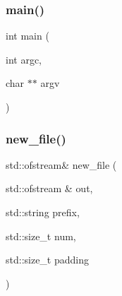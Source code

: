 \subsubsection{\texorpdfstring{main()}{main()}}
{\footnotesize\ttfamily int main (\begin{DoxyParamCaption}\item[{int}]{argc,  }\item[{char $\ast$$\ast$}]{argv }\end{DoxyParamCaption})}

\mbox{\label{irk-part_8cpp_ac847d7f963015a5fe6bcc99b24a2f5b4}} 
\subsubsection{\texorpdfstring{new\+\_\+file()}{new\_file()}}
{\footnotesize\ttfamily std\+::ofstream\& new\+\_\+file (\begin{DoxyParamCaption}\item[{std\+::ofstream \&}]{out,  }\item[{std\+::string}]{prefix,  }\item[{std\+::size\+\_\+t}]{num,  }\item[{std\+::size\+\_\+t}]{padding }\end{DoxyParamCaption})}

